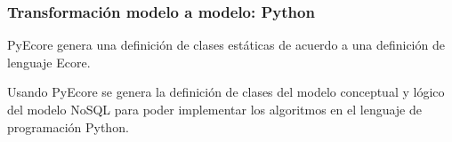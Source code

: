 \subsubsection*{Transformación modelo a modelo: Python}\label{sec:xtend}
PyEcore genera una definición de clases estáticas de acuerdo a una definición de lenguaje Ecore.

Usando PyEcore se genera la definición de clases del modelo conceptual y lógico del modelo NoSQL para poder implementar los algoritmos en el lenguaje de programación Python.


